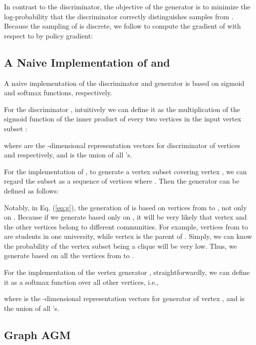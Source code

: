 \documentclass[sigconf]{acmart}
\begin{document}
In contrast to the discriminator, the objective of the generator is to minimize the log-probability that the discriminator correctly distinguishes samples from .
Because the sampling of  is discrete, we follow \cite{schulman2015gradient,yu2017seqgan,GraphGAN} to compute the gradient of  with respect to  by policy gradient:

\subsection{A Naive Implementation of  and }

A naive implementation of the discriminator and generator is based on sigmoid and softmax functions, respectively.

For the discriminator , intuitively we can define it as the multiplication of the sigmoid function of the inner product of every two vertices in the input vertex subset :


where  are the -dimensional representation vectors for discriminator  of vertices  and  respectively, and  is the union of all 's.

For the implementation of ,
to generate a vertex subset  covering vertex , we can regard the subset as a sequence of vertices  where .
Then the generator  can be defined as follows:


Notably, in Eq. (\ref{eq:g}), the generation of  is based on vertices from  to , not only on .
Because if we generate  based only on , it will be very likely that vertex  and the other vertices belong to different communities.
For example, vertices from  to  are students in one university, while vertex  is the parent of .
Simply, we can know the probability of the vertex subset  being a clique will be very low.
Thus, we generate  based on all the vertices from  to .

For the implementation of the vertex generator , straightforwardly, we can define it as a softmax function over all other vertices, i.e.,

where  is the -dimensional representation vectors for generator  of vertex , and  is the union of all 's.

\subsection{Graph AGM}
\label{sec:graph-agm}
\end{document}
